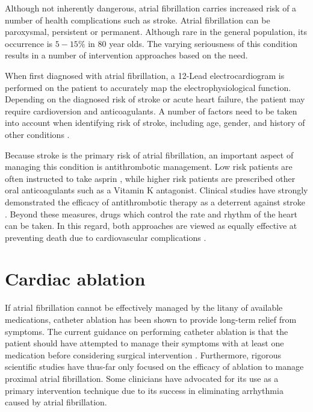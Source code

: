 \documentclass[letterpaper,10pt,conference]{ieeeconf}   %
\begin{document}
Although not inherently dangerous, atrial fibrillation carries increased risk of a number of health complications such as stroke. Atrial fibrillation can be paroxysmal, persistent or permanent.  Although rare in the general population, its occurrence is $5-15\%$ in 80 year olds. The varying seriousness of this condition results in a number of intervention approaches based on the need.

When first diagnosed with atrial fibrillation, a 12-Lead electrocardiogram is performed on the patient to accurately map the electrophysiological function. Depending on the diagnosed risk of stroke or acute heart failure, the patient may require cardioversion and anticoagulants.  A number of factors need to be taken into account when identifying risk of stroke, including age, gender, and history of other conditions \cite{lip:10a}.

Because stroke is the primary risk of atrial fibrillation, an important aspect of managing this condition is antithrombotic management. Low risk patients are often instructed to take asprin \cite{camm:10a}, while higher risk patients are prescribed other oral anticoagulants such as a Vitamin K antagonist. Clinical studies have strongly demonstrated the efficacy of antithrombotic therapy as a deterrent against stroke \cite{hart:07a}. Beyond these measures, drugs which control the rate and rhythm of the heart can be taken. In this regard, both approaches are viewed as equally effective at preventing death due to cardiovascular complications \cite{camm:10a,atrial:02a,van:02a}.   

\section{Cardiac ablation}
\label{sec:ablation}

If atrial fibrillation cannot be effectively managed by the litany of available medications, catheter ablation has been shown to provide long-term relief from symptoms. The current guidance on performing catheter ablation is that the patient should have attempted to manage their symptoms with at least one medication before considering surgical intervention \cite{camm:10a}. Furthermore, rigorous scientific studies have thus-far only focused on the efficacy of ablation to manage proximal atrial fibrillation. Some clinicians have advocated for its use as a primary intervention technique due to its success in eliminating arrhythmia caused by atrial fibrillation. 
\end{document}
